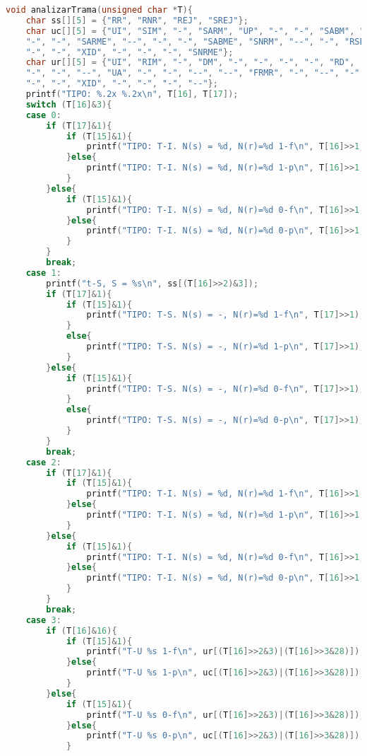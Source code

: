\begin{lstlisting}[language={C}, caption={Analizador de tramas en C}, label={Script}]
void analizarTrama(unsigned char *T){
    char ss[][5] = {"RR", "RNR", "REJ", "SREJ"};
    char uc[][5] = {"UI", "SIM", "-", "SARM", "UP", "-", "-", "SABM", "DISC",
    "-", "-", "SARME", "--", "-", "-", "SABME", "SNRM", "--", "-", "RSET", "-",
    "-", "-", "XID", "-", "-", "-", "SNRME"};
    char ur[][5] = {"UI", "RIM", "-", "DM", "-", "-", "-", "-", "RD",
    "-", "-", "--", "UA", "-", "-", "--", "--", "FRMR", "-", "--", "-",
    "-", "-", "XID", "-", "-", "-", "--"};
    printf("TIPO: %.2x %.2x\n", T[16], T[17]);
    switch (T[16]&3){
    case 0:
        if (T[17]&1){
            if (T[15]&1){
                printf("TIPO: T-I. N(s) = %d, N(r)=%d 1-f\n", T[16]>>1, T[17]>>1);
            }else{
                printf("TIPO: T-I. N(s) = %d, N(r)=%d 1-p\n", T[16]>>1, T[17]>>1);
            }
        }else{
            if (T[15]&1){
                printf("TIPO: T-I. N(s) = %d, N(r)=%d 0-f\n", T[16]>>1, T[17]>>1);
            }else{
                printf("TIPO: T-I. N(s) = %d, N(r)=%d 0-p\n", T[16]>>1, T[17]>>1);
            }
        }
        break;
    case 1:
        printf("t-S, S = %s\n", ss[(T[16]>>2)&3]);
        if (T[17]&1){
            if (T[15]&1){
                printf("TIPO: T-S. N(s) = -, N(r)=%d 1-f\n", T[17]>>1);
            }
            else{
                printf("TIPO: T-S. N(s) = -, N(r)=%d 1-p\n", T[17]>>1);
            }
        }else{
            if (T[15]&1){
                printf("TIPO: T-S. N(s) = -, N(r)=%d 0-f\n", T[17]>>1);
            }
            else{
                printf("TIPO: T-S. N(s) = -, N(r)=%d 0-p\n", T[17]>>1);
            }
        }
        break;
    case 2:
        if (T[17]&1){
            if (T[15]&1){
                printf("TIPO: T-I. N(s) = %d, N(r)=%d 1-f\n", T[16]>>1, T[17]>>1);
            }else{
                printf("TIPO: T-I. N(s) = %d, N(r)=%d 1-p\n", T[16]>>1, T[17]>>1);
            }
        }else{
            if (T[15]&1){
                printf("TIPO: T-I. N(s) = %d, N(r)=%d 0-f\n", T[16]>>1, T[17]>>1);
            }else{
                printf("TIPO: T-I. N(s) = %d, N(r)=%d 0-p\n", T[16]>>1, T[17]>>1);
            }
        }
        break;
    case 3: 
        if (T[16]&16){
            if (T[15]&1){
                printf("T-U %s 1-f\n", ur[(T[16]>>2&3)|(T[16]>>3&28)]);
            }else{
                printf("T-U %s 1-p\n", uc[(T[16]>>2&3)|(T[16]>>3&28)]);
            }
        }else{
            if (T[15]&1){
                printf("T-U %s 0-f\n", ur[(T[16]>>2&3)|(T[16]>>3&28)]);
            }else{
                printf("T-U %s 0-p\n", uc[(T[16]>>2&3)|(T[16]>>3&28)]);
            }

\end{lstlisting}
